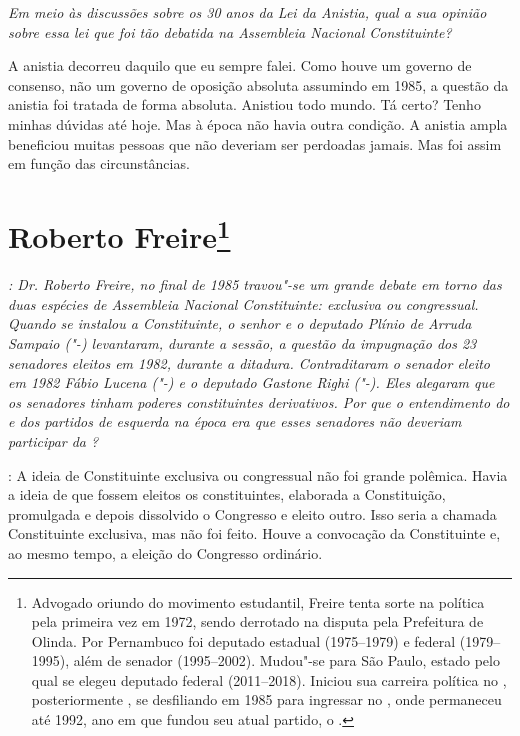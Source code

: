 \medskip

\noindent\emph{Em meio às discussões sobre os 30 anos da Lei da Anistia, qual a
sua opinião sobre essa lei que foi tão debatida na Assembleia Nacional
Constituinte?}

A anistia decorreu daquilo que eu sempre falei. Como
houve um governo de consenso, não um governo de oposição absoluta
assumindo em 1985, a questão da anistia foi tratada de forma absoluta.
Anistiou todo mundo. Tá certo? Tenho minhas dúvidas até hoje. Mas à
época não havia outra condição. A anistia ampla beneficiou muitas
pessoas que não deveriam ser perdoadas jamais. Mas foi assim em função
das circunstâncias.

\chapter{Roberto Freire\footnote{Advogado oriundo do movimento estudantil, Freire tenta sorte na
política pela primeira vez em 1972, sendo derrotado na disputa pela
Prefeitura de Olinda. Por Pernambuco foi deputado estadual (1975--1979) e
federal (1979--1995), além de senador (1995--2002). Mudou"-se para São
Paulo, estado pelo qual se elegeu deputado federal (2011--2018). Iniciou
sua carreira política no , posteriormente , se desfiliando em
1985 para ingressar no , onde permaneceu até 1992, ano em que fundou
seu atual partido, o .}}

\emph{: Dr. Roberto Freire, no final de 1985 travou"-se um grande debate
em torno das duas espécies de Assembleia Nacional Constituinte:
exclusiva ou congressual. Quando se instalou a Constituinte, o senhor e
o deputado Plínio de Arruda Sampaio ("-) levantaram, durante a
sessão, a questão da impugnação dos 23 senadores eleitos em 1982,
durante a ditadura. Contraditaram o senador eleito em 1982 Fábio Lucena
("-) e o deputado Gastone Righi ("-). Eles alegaram que os
senadores tinham poderes constituintes derivativos. Por que o
entendimento do  e dos partidos de esquerda na época era que esses
senadores não deveriam participar da ?}

: A ideia de Constituinte exclusiva ou congressual não
foi grande polêmica. Havia a ideia de que fossem eleitos os
constituintes, elaborada a Constituição, promulgada e depois dissolvido
o Congresso e eleito outro. Isso seria a chamada Constituinte exclusiva,
mas não foi feito. Houve a convocação da Constituinte e, ao mesmo tempo,
a eleição do Congresso ordinário.

